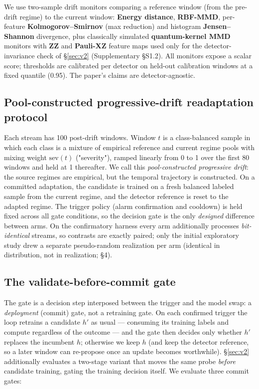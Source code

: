 \documentclass[journal]{IEEEtran}
\begin{document}
We use two-sample drift monitors comparing a reference window (from the pre-drift regime) to the current window: \textbf{Energy distance}, \textbf{RBF-MMD}, per-feature \textbf{Kolmogorov--Smirnov} (max reduction) and histogram \textbf{Jensen--Shannon} divergence, plus classically simulated \textbf{quantum-kernel MMD} monitors with \textbf{ZZ} and \textbf{Pauli-XZ} feature maps used only for the detector-invariance check of \S\ref{sec:v2} (Supplementary \S S1.2). All monitors expose a scalar score; thresholds are calibrated per detector on held-out calibration windows at a fixed quantile (0.95). The paper's claims are detector-agnostic.


\subsection{Pool-constructed progressive-drift readaptation protocol}


Each stream has 100 post-drift windows. Window $t$ is a class-balanced sample in which each class is a mixture of empirical reference and current regime pools with mixing weight $\mathrm{sev}(t)$ ("severity"), ramped linearly from 0 to 1 over the first 80 windows and held at 1 thereafter. We call this \emph{pool-constructed progressive drift}: the source regimes are empirical, but the temporal trajectory is constructed. On a committed adaptation, the candidate is trained on a fresh balanced labeled sample from the current regime, and the detector reference is reset to the adapted regime. The trigger policy (alarm confirmation and cooldown) is held fixed across all gate conditions, so the decision gate is the only \emph{designed} difference between arms. On the confirmatory harness every arm additionally processes \emph{bit-identical} streams, so contrasts are exactly paired; only the initial exploratory study drew a separate pseudo-random realization per arm (identical in distribution, not in realization; \S4).


\subsection{The validate-before-commit gate}
\label{sec:gates}


The gate is a decision step interposed between the trigger and the model swap: a \emph{deployment} (commit) gate, not a retraining gate. On each confirmed trigger the loop retrains a candidate $h'$ as usual --- consuming its training labels and compute regardless of the outcome --- and the gate then decides only whether $h'$ replaces the incumbent $h$; otherwise we keep $h$ (and keep the detector reference, so a later window can re-propose once an update becomes worthwhile). \S\ref{sec:v2} additionally evaluates a two-stage variant that moves the same probe \emph{before} candidate training, gating the training decision itself. We evaluate three commit gates:
\end{document}
